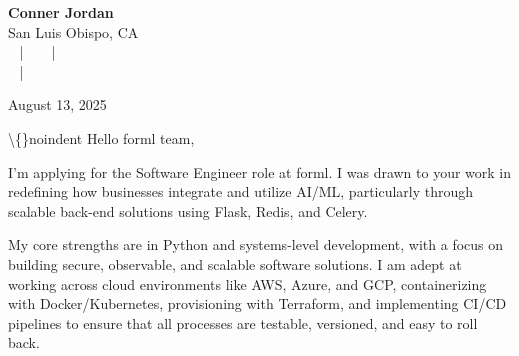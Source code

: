 \documentclass[letterpaper,11pt]{article}
\begin{document}
\begin{center}
  {\Huge \textbf{Conner Jordan}}\\[4pt]
  {\Large San Luis Obispo, CA}\\[4pt]
  \href{tel:+18059759793}{
    } ~ | ~
  \href{mailto:connercharlesjordan@gmail.com}{
    } ~ | ~
   \\
  \href{https://www.linkedin.com/in/conner-jordan-4b268514a/}{
    } ~ | ~
  \href{https://github.com/cjordan223}{
    }
\end{center}



\vspace{16pt}

\begin{flushright}
August 13, 2025
\end{flushright}


\textbackslash\{\}noindent
Hello forml team,

\vspace{16pt}

I'm applying for the Software Engineer role at forml. I was drawn to your work in redefining how businesses integrate and utilize AI/ML, particularly through scalable back-end solutions using Flask, Redis, and Celery.

\vspace{16pt}

My core strengths are in Python and systems-level development, with a focus on building secure, observable, and scalable software solutions. I am adept at working across cloud environments like AWS, Azure, and GCP, containerizing with Docker/Kubernetes, provisioning with Terraform, and implementing CI/CD pipelines to ensure that all processes are testable, versioned, and easy to roll back.

\vspace{16pt}
\end{document}
